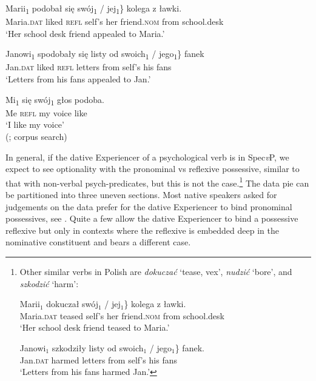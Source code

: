 \documentclass[output=paper,modfonts,nonflat
]{langsci/langscibook}
\begin{document}
\ea \label{ex:witkos:44}
\gll Marii\textsubscript{1} podobał się \minsp{\{*} swój\textsubscript{1} / jej\textsubscript{1}\} kolega z ławki.\\
     Maria.\textsc{dat} liked \textsc{refl} {} self’s {} her friend.\textsc{nom} from school.desk\\
\glt `Her school desk friend appealed to Maria.'
\z

\ea \label{ex:witkos:45}
\gll Janowi\textsubscript{1} spodobały się listy od \minsp{\{} swoich\textsubscript{1} / jego\textsubscript{1}\} fanek\\
     Jan.\textsc{dat} liked \textsc{refl} letters from {} self’s {} his fans\\
\glt `Letters from his fans appealed to Jan.'
\z

\ea \label{ex:witkos:46}
\gll Mi\textsubscript{1} się swój\textsubscript{1} głos podoba.\\
     Me \textsc{refl} my voice like\\
\glt `I like my voice' \\ 
\xspace\hfill(\citealt[107, ex. (62)]{miechowicz2008}; corpus search)
\z

\noindent In general, if the dative Experiencer of a psychological verb is in Spec\textit{v}P, we expect to see optionality with the pronominal vs reflexive possessive, similar to that with non-verbal psych-predicates, but this is not the case.\footnote{\label{fn24}Other similar verbs in Polish are \textit{dokuczać} ‘tease, vex’, \textit{nudzić} ‘bore’, and \textit{szkodzić} ‘harm’:

\ea
\gll Marii$_1$ dokuczał \minsp{\{*} swój$_1$ / jej$_1$\} kolega z ławki.\\
Maria.\textsc{dat} teased {} self’s  {} her friend.\textsc{nom} from school.desk\\
\glt `Her school desk friend teased to Maria.’
\z

\ea
\gll Janowi$_1$ szkodziły listy od  swoich$_1$ / jego$_1$\} fanek.\\
Jan.\textsc{dat} harmed letters from {} self’s {} his fans\\
\glt `Letters from his fans harmed Jan.’
\z} The data pie can be partitioned into three uneven sections. Most native speakers asked for judgements on the data prefer for the dative Experiencer to bind pronominal possessives, see . Quite a few allow the dative Experiencer to bind a possessive reflexive but only in contexts where the reflexive is embedded deep in the nominative constituent and bears a different case. 
\end{document}

